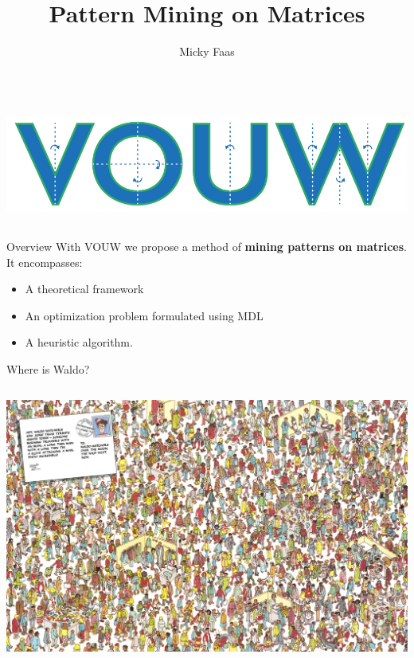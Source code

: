 \documentclass[11pt]{beamer}
\author{Micky Faas}
\title{Pattern Mining on Matrices}
\begin{document}
\beamertemplatenavigationsymbolsempty
\begin{frame}
\nointerlineskip%
\begin{columns}
\column{\dimexpr\paperwidth}
\centering %


\includegraphics[width=0.4\paperwidth]{"VOUW logo-01"} 
\maketitle
\end{columns}
\end{frame}


\begin{frame}{Overview}
With VOUW we propose a method of \textbf{mining patterns on matrices}. It encompasses:
\begin{itemize}
\item A theoretical framework
\item An optimization problem formulated using MDL
\item A heuristic algorithm.
\end{itemize}
\end{frame}


\begin{frame}{Where is Waldo?}
\nointerlineskip%
\begin{columns}
\column{\dimexpr\paperwidth}
\centering
\includegraphics[width=\paperwidth]{"waldo"} 
\end{columns}
\end{frame}
\end{document}
